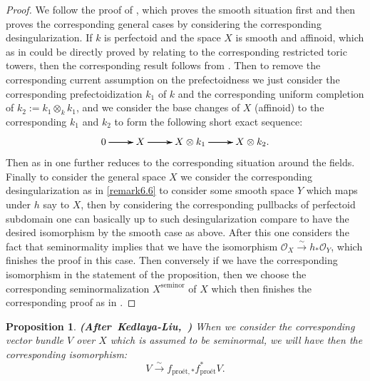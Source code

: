 \documentclass[12pt]{amsart}
\newtheorem{proposition}[theorem]{Proposition}
\theoremstyle{definition}
\numberwithin{equation}{section}
\begin{document}
\begin{proof}
We follow the proof of \cite[Theorem 8.2.3]{KL16}, which proves the smooth situation first and then proves the corresponding general cases by considering the corresponding desingularization. If $k$ is perfectoid and the space $X$ is smooth and affinoid, which as in \cite[Theorem 8.2.3]{KL16} could be directly proved by relating to the corresponding restricted toric towers, then the corresponding result follows from \cite[Theorem 8.2.3]{KL16}. Then to remove the corresponding current assumption on the prefectoidness we just consider the corresponding prefectoidization $k_1$ of $k$ and the corresponding uniform completion of $k_2:=k_1\otimes_k k_1$, and we consider the base changes of $X$ (affinoid) to the corresponding $k_1$ and $k_2$ to form the following short exact sequence:
\[
\xymatrix@R+0pc@C+0pc{
0\ar[r] \ar[r] \ar[r] &X    \ar[r] \ar[r] \ar[r]  &X\otimes k_1 \ar[r] \ar[r] \ar[r] & X\otimes k_2.
}
\]
Then as in \cite[Theorem 8.2.3]{KL16} one further reduces to the corresponding situation around the fields. Finally to consider the general space $X$ we consider the corresponding desingularization as in \cref{remark6.6} to consider some smooth space $Y$ which maps under $h$ say to $X$, then by considering the corresponding pullbacks of perfectoid subdomain one can basically up to such desingularization compare to have the desired isomorphism by the smooth case as above. After this one considers the fact that seminormality implies that we have the isomorphism $\mathcal{O}_{X}\overset{\sim}{\rightarrow} h_* \mathcal{O}_{Y}$, which finishes the proof in this case. Then conversely if we have the corresponding isomorphism in the statement of the proposition, then we choose the corresponding seminormalization $X^{\text{seminor}}$ of $X$ which then finishes the corresponding proof as in \cite[Theorem 8.2.3]{KL16}.

\end{proof}


 
\begin{proposition}\mbox{\bf{(After Kedlaya-Liu, \cite[Corollary 8.2.4]{KL16})}}
When we consider the corresponding vector bundle $V$ over $X$ which is assumed to be seminormal, we will have then the corresponding isomorphism:
\begin{displaymath}
V\overset{\sim}{\longrightarrow}f_{\text{pro\'et},*}f^*_{\text{pro\'et}}V.	
\end{displaymath}

	
\end{proposition}
\end{document}
